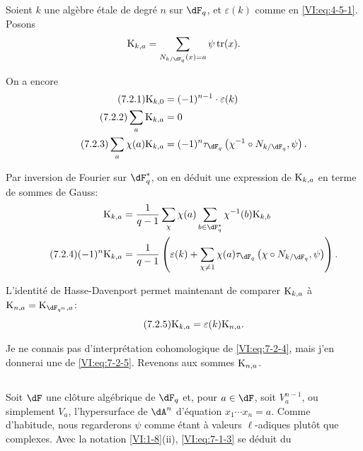 \documentclass[oneside]{book}
\DeclareMathOperator{\tr}{tr}
\newcommand{\kloos}{\textnormal{K}} %
\theoremstyle{sga-source}
\theoremstyle{sga-source-dash}
\theoremstyle{sga-source-dotdash}
\theoremstyle{sga-source-number-note-dash}
\theoremstyle{sga-source-note-number-dotdash}
\theoremstyle{sga-source-example-dotdash}
\theoremstyle{sga-source-inline-number}
\theoremstyle{sga-source-bare-number}
\theoremstyle{sga-source}
\newcommand{\PrintPage}[1]{}\newcommand{\MathPage}[1]{}\newcommand{\PrintCite}[2]{#1}\newcommand{\var}[3]{#1}
\begin{document}
Soient $k$ une algèbre étale de degré $n$ sur $\dF_q$, et $\varepsilon(k)$ 
comme en \eqref{VI:eq:4-5-1}. Posons 
\[
  \kloos_{k,a} = \sum_{N_{k/\dF_q}(x)=a} \psi \tr(x) \text{.} 
\]
\PrintPage{220}
On a encore 
\begin{align*}\tag{7.2.1}\label{VI:eq:7-2-1}
  \kloos_{k,0} &= (-1)^{n-1} \cdot \varepsilon(k) \\ \tag{7.2.2}\label{VI:eq:7-2-2}
  \sum_a \kloos_{k,a} &= 0 \\ \tag{7.2.3}\label{VI:eq:7-2-3}
  \sum_a \chi(a) \kloos_{k,a} &= (-1)^n \tau_{\dF_q}\left(\chi^{-1}\circ N_{k/\dF_q},\psi\right) \text{.} 
\end{align*}

Par inversion de Fourier sur $\dF_q^\ast$, on en déduit une expression de 
$\kloos_{k,a}$ \var{en terme de sommes de Gauss}{en termes de sommes de Gauss}{S45-SOL-0933}: 
\begin{align*} 
  \kloos_{k,a} &= \frac{1}{q-1} \sum_\chi \chi(a) \sum_{b\in \dF_q^\ast} \chi^{-1}(b) \kloos_{k,b} \\ \tag{7.2.4}\label{VI:eq:7-2-4}
  (-1)^n \kloos_{k,a} &= \frac{1}{q-1} \left(\varepsilon(k) + \sum_{\chi\ne 1} \chi(a) \tau_{\dF_q}\left(\chi\circ N_{k/\dF_q},\psi\right) \right) \text{.} 
\end{align*}

L'identité de Hasse-Davenport permet maintenant de comparer $\kloos_{k,a}$ 
à $\kloos_{n,a} = \var{\kloos_{\dF_{q^n},a}}{\kloos_{\dF_q^n,a}}{S45-SOL-0934}$: 
\begin{equation*}\tag{7.2.5}\label{VI:eq:7-2-5}
  \kloos_{k,a} = \varepsilon(k) \kloos_{n,a} \text{.} 
\end{equation*}

Je ne connais pas d'interprétation cohomologique de \eqref{VI:eq:7-2-4}, mais 
j'en donnerai une de \eqref{VI:eq:7-2-5}. Revenons aux sommes $\kloos_{n,a}$. 





\subsection{}\label{VI:7-3}

Soit $\dF$ une clôture algébrique de $\dF_q$ et, pour $a\in \dF$, soit 
$V_a^{n-1}$, ou simplement $V_a$, l'hypersurface de $\dA^n$ d'équation 
$x_1 \dotsm x_n=a$. Comme d'habitude, nous regarderons $\psi$ comme étant à 
valeurs $\ell$-adiques plutôt que complexes. Avec la notation 
\ref{VI:1-8}(ii), \eqref{VI:eq:7-1-3} se déduit du 
\end{document}
